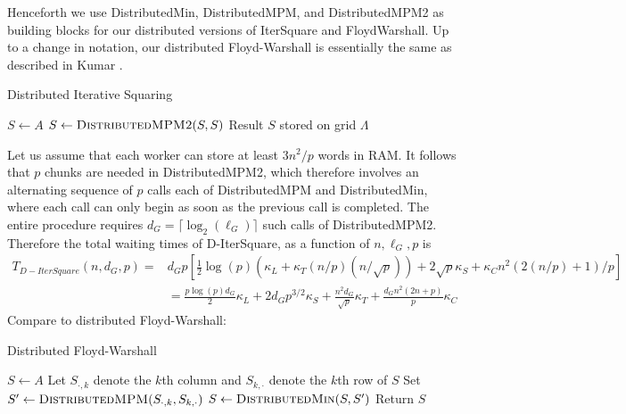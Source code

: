 \documentclass{article} %
\begin{document}
Henceforth we use {\sc DistributedMin}, {\sc DistributedMPM}, and {\sc
  DistributedMPM2} as building blocks for our distributed versions of
{\sc IterSquare} and {\sc FloydWarshall}.  Up to a change in notation,
our distributed Floyd-Warshall is essentially the same as described in
Kumar \cite{Kumar1991}.

\begin{algorithm}[H]
\caption{Distributed Iterative Squaring}
\begin{algorithmic}
  \State $S \leftarrow A$
    \State $S \leftarrow \text{\sc DistributedMPM2}(S, S)$
  \EndFor
  \State Result $S$ stored on grid $\Lambda$
\EndFunction
\end{algorithmic}
\end{algorithm}

Let us assume that each worker can store at least $3n^2/p$ words in
RAM. It follows that $p$ chunks are needed in {\sc DistributedMPM2},
which therefore involves an alternating sequence of $p$ calls each of
{\sc DistributedMPM} and {\sc DistributedMin}, where each call can
only begin as soon as the previous call is completed.  The entire
procedure requires $d_G = \lceil \log_2(\ell_G) \rceil$ such calls of
{\sc DistributedMPM2}.  Therefore the total waiting times of {\sc
  D-IterSquare}, as a function of $n, \ell_G, p$ is
\begin{align*}
T_{D-IterSquare}(n, d_G, p) =& d_G p \left[\frac{1}{2}\log(p) (\kappa_L + \kappa_T (n/p) (n/\sqrt{p})) + 2\sqrt{p}\kappa_S +  \kappa_C n^2(2(n/p)+1)/p\right]\\
&= \frac{p \log (p)d_G }{2} \kappa_L + 2 d_G p^{3/2} \kappa_S + \frac{n^2 d_G}{\sqrt{p}} \kappa_T +  \frac{d_G n^2(2n + p)}{p}\kappa_C 
\end{align*}
Compare to distributed Floyd-Warshall:

\begin{algorithm}[H]
\caption{Distributed Floyd-Warshall}
\begin{algorithmic}
  \State $S \leftarrow A$
    \State Let $S_{\cdot, k}$ denote the $k$th column and $S_{k, \cdot}$ denote the $k$th row of $S$
    \State Set $S' \leftarrow \text{\sc DistributedMPM}(S_{\cdot, k}, S_{k, \cdot})$
    \State $S \leftarrow \text{\sc DistributedMin}(S, S')$
  \EndFor
  \State Return $S$
\EndFunction
\end{algorithmic}
\end{algorithm}
\end{document}

